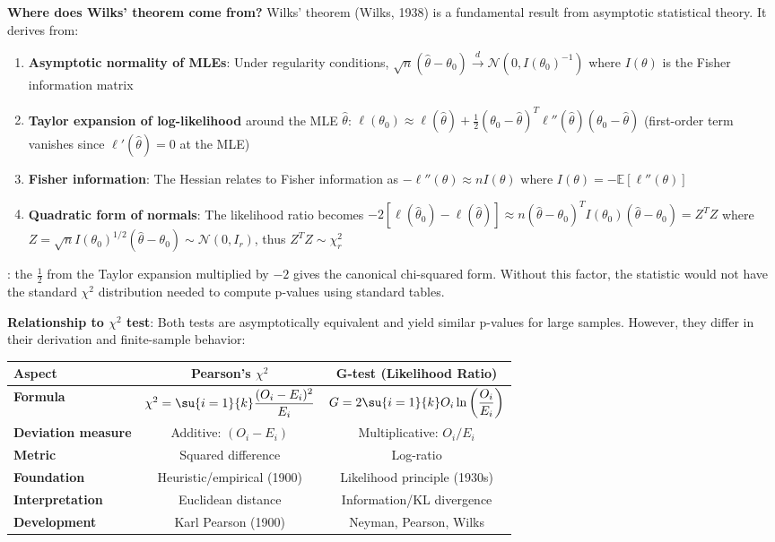 \textbf{Where does Wilks' theorem come from?}
Wilks' theorem (Wilks, 1938) is a fundamental result from asymptotic statistical theory. It derives from:
\begin{enumerate}
    \item \textbf{Asymptotic normality of MLEs}: Under regularity conditions,
        $\sqrt{n}(\hat{\theta} - \theta_0) \xrightarrow{d} \mathcal{N}(0, I(\theta_0)^{-1})$
        where $I(\theta)$ is the Fisher information matrix
    \item \textbf{Taylor expansion of log-likelihood} around the MLE $\hat{\theta}$:
        $\ell(\theta_0) \approx \ell(\hat{\theta}) + \frac{1}{2}(\theta_0 - \hat{\theta})^T \ell''(\hat{\theta})(\theta_0 - \hat{\theta})$
        (first-order term vanishes since $\ell'(\hat{\theta}) = 0$ at the MLE)
    \item \textbf{Fisher information}: The Hessian relates to Fisher information as
        $-\ell''(\theta) \approx nI(\theta)$ where $I(\theta) = -\mathbb{E}[\ell''(\theta)]$
    \item \textbf{Quadratic form of normals}: The likelihood ratio becomes
        $-2[\ell(\hat{\theta}_0) - \ell(\hat{\theta})] \approx n(\hat{\theta} - \theta_0)^T I(\theta_0)(\hat{\theta} - \theta_0) = Z^T Z$
        where $Z = \sqrt{n}I(\theta_0)^{1/2}(\hat{\theta} - \theta_0) \sim \mathcal{N}(0, I_r)$, thus $Z^T Z \sim \chi^2_r$
\end{enumerate}
: the $\frac{1}{2}$ from the Taylor expansion multiplied by $-2$
gives the canonical chi-squared form. Without this factor, the statistic would not have the standard
$\chi^2$ distribution needed to compute p-values using standard tables.

\textbf{Relationship to $\chi^2$ test}:
Both tests are asymptotically equivalent and yield similar p-values for large samples. However,
they differ in their derivation and finite-sample behavior:

\begin{center}
\begin{tabular}{|l|c|c|}
    \hline
    \textbf{Aspect} & \textbf{Pearson's $\chi^2$} & \textbf{G-test (Likelihood Ratio)} \\
    \hline
    \textbf{Formula} & $\chi^2 = \su{i=1}{k}\dfrac{(O_i - E_i)^2}{E_i}$ & $G = 2\su{i=1}{k}O_i\ln\left(\dfrac{O_i}{E_i}\right)$ \\
    \hline
    \textbf{Deviation measure} & Additive: $(O_i - E_i)$ & Multiplicative: $O_i/E_i$ \\
    \hline
    \textbf{Metric} & Squared difference & Log-ratio \\
    \hline
    \textbf{Foundation} & Heuristic/empirical (1900) & Likelihood principle (1930s) \\
    \hline
    \textbf{Interpretation} & Euclidean distance & Information/KL divergence \\
    \hline
    \textbf{Development} & Karl Pearson (1900) & Neyman, Pearson, Wilks \\
    \hline
\end{tabular}
\end{center}

